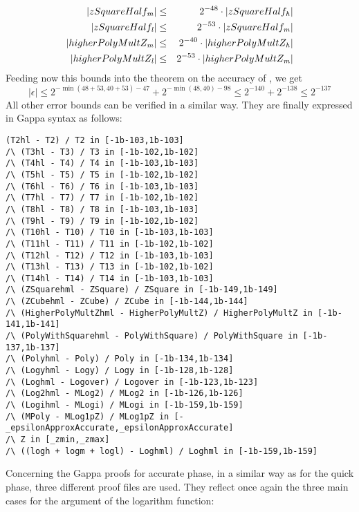 \begin{eqnarray*}
\left \vert zSquareHalf_{\mathit{m}} \right \vert & \leq & 2^{-48} \cdot \left \vert zSquareHalf_{\mathit{h}} \right \vert \\
\left \vert zSquareHalf_{\mathit{l}} \right \vert & \leq & 2^{-53} \cdot \left \vert zSquareHalf_{\mathit{m}} \right \vert \\
\left \vert higherPolyMultZ_{\mathit{m}} \right \vert & \leq & 2^{-40} \cdot \left \vert higherPolyMultZ_{\mathit{h}} \right \vert \\
\left \vert higherPolyMultZ_{\mathit{l}} \right \vert & \leq & 2^{-53} \cdot \left \vert higherPolyMultZ_{\mathit{m}} \right \vert
\end{eqnarray*}
Feeding now this bounds into the theorem on the accuracy of \AddTT, we get
$$\left \vert \epsilon \right \vert \leq 2^{-\min\left( 48 + 53, 40 + 53 \right) - 47} + 2^{-\min \left( 48, 40 \right) - 98} \leq 2^{-140} + 2^{-138} \leq 2^{-137}$$
All other error bounds can be verified in a similar way. They are finally expressed in Gappa syntax as follows:
\begin{lstlisting}[caption={Relative error bounds in Gappa code},firstnumber=139]
(T2hl - T2) / T2 in [-1b-103,1b-103]
/\ (T3hl - T3) / T3 in [-1b-102,1b-102]
/\ (T4hl - T4) / T4 in [-1b-103,1b-103]
/\ (T5hl - T5) / T5 in [-1b-102,1b-102]
/\ (T6hl - T6) / T6 in [-1b-103,1b-103]
/\ (T7hl - T7) / T7 in [-1b-102,1b-102]
/\ (T8hl - T8) / T8 in [-1b-103,1b-103]
/\ (T9hl - T9) / T9 in [-1b-102,1b-102]
/\ (T10hl - T10) / T10 in [-1b-103,1b-103]
/\ (T11hl - T11) / T11 in [-1b-102,1b-102]
/\ (T12hl - T12) / T12 in [-1b-103,1b-103]
/\ (T13hl - T13) / T13 in [-1b-102,1b-102]
/\ (T14hl - T14) / T14 in [-1b-103,1b-103]
/\ (ZSquarehml - ZSquare) / ZSquare in [-1b-149,1b-149]
/\ (ZCubehml - ZCube) / ZCube in [-1b-144,1b-144]
/\ (HigherPolyMultZhml - HigherPolyMultZ) / HigherPolyMultZ in [-1b-141,1b-141]
/\ (PolyWithSquarehml - PolyWithSquare) / PolyWithSquare in [-1b-137,1b-137]
/\ (Polyhml - Poly) / Poly in [-1b-134,1b-134]
/\ (Logyhml - Logy) / Logy in [-1b-128,1b-128]
/\ (Loghml - Logover) / Logover in [-1b-123,1b-123]
/\ (Log2hml - MLog2) / MLog2 in [-1b-126,1b-126]
/\ (Logihml - MLogi) / MLogi in [-1b-159,1b-159]
/\ (MPoly - MLog1pZ) / MLog1pZ in [-_epsilonApproxAccurate,_epsilonApproxAccurate]
/\ Z in [_zmin,_zmax]
/\ ((logh + logm + logl) - Loghml) / Loghml in [-1b-159,1b-159]
\end{lstlisting}
Concerning the Gappa proofs for accurate phase, in a similar way as for the quick phase, three different proof
files are used. They reflect once again the three main cases for the argument of the logarithm function:

